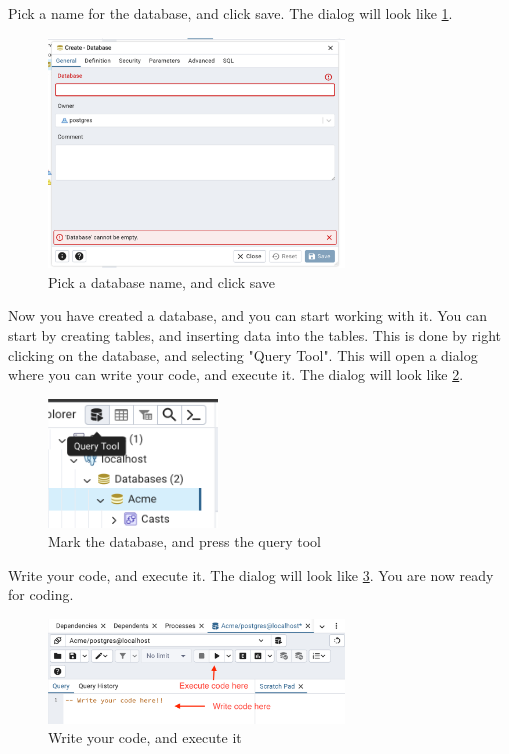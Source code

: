 Pick a name for the database, and click save. The dialog will look like \cref{fig:1.pgadmin7}.

\begin{figure}[H]
    \centering
    \includegraphics[width=0.7\textwidth]{content/1-relational-databases/figures/pgadmin/7.png}
    \caption{Pick a database name, and click save}
    \label{fig:1.pgadmin7}
\end{figure}

Now you have created a database, and you can start working with it. You can start by creating tables, and inserting data into the tables. This is done by right clicking on the database, and selecting "Query Tool". This will open a dialog where you can write your code, and execute it. The dialog will look like \cref{fig:1.pgadmin8}.

\begin{figure}[H]
    \centering
    \includegraphics[width=0.4\textwidth]{content/1-relational-databases/figures/pgadmin/8.png}
    \caption{Mark the database, and press the query tool}
    \label{fig:1.pgadmin8}
\end{figure}

Write your code, and execute it. The dialog will look like \cref{fig:1.pgadmin9}. You are now ready for coding.

\begin{figure}[H]
    \centering
    \includegraphics[width=0.7\textwidth]{content/1-relational-databases/figures/pgadmin/9.png}
    \caption{Write your code, and execute it}
    \label{fig:1.pgadmin9}
\end{figure}

